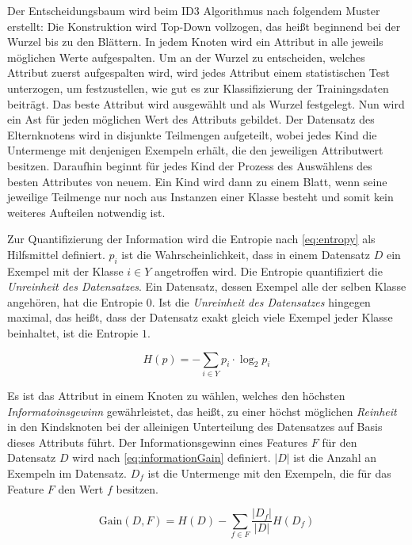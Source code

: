 Der Entscheidungsbaum wird beim ID3 Algorithmus nach folgendem Muster erstellt: Die Konstruktion wird Top-Down vollzogen, das heißt beginnend bei der Wurzel bis zu den Blättern. In jedem Knoten wird ein Attribut in alle jeweils möglichen Werte aufgespalten. Um an der Wurzel zu entscheiden, welches Attribut zuerst aufgespalten wird, wird jedes Attribut einem statistischen Test unterzogen, um festzustellen, wie \glqq gut\grqq{} es zur Klassifizierung der Trainingsdaten beiträgt. Das \glqq beste\grqq{} Attribut wird ausgewählt und als Wurzel festgelegt. Nun wird ein Ast für jeden möglichen Wert des Attributs gebildet. Der Datensatz des Elternknotens wird in disjunkte Teilmengen aufgeteilt, wobei jedes Kind die Untermenge mit denjenigen Exempeln erhält, die den jeweiligen Attributwert besitzen. Daraufhin beginnt für jedes Kind der Prozess des Auswählens des \glqq besten\grqq{} Attributes von neuem. Ein Kind wird dann zu einem Blatt, wenn seine jeweilige Teilmenge nur noch aus Instanzen einer Klasse besteht und somit kein weiteres Aufteilen notwendig ist.\cite[S. 55]{machine_mitchell}

Zur Quantifizierung der Information wird die Entropie nach \autoref{eq:entropy} als Hilfsmittel definiert. $p_i$ ist die Wahrscheinlichkeit, dass in einem Datensatz $D$ ein Exempel mit der Klasse $i \in Y$ angetroffen wird. Die Entropie quantifiziert die \emph{Unreinheit des Datensatzes}. Ein Datensatz, dessen Exempel alle der selben Klasse angehören, hat die Entropie $0$. Ist die \emph{Unreinheit des Datensatzes} hingegen maximal, das heißt, dass der Datensatz exakt gleich viele Exempel jeder Klasse beinhaltet, ist die Entropie $1$. \cite[S. 135]{machine_marsland}

\begin{equation}
H(p) = -\sum_{i \in Y} p_i \cdot \log_{2} p_i
\label{eq:entropy}
\end{equation}

Es ist das Attribut in einem Knoten zu wählen, welches den höchsten \emph{Informatoinsgewinn} gewährleistet, das heißt, zu einer höchst möglichen \emph{Reinheit} in den Kindsknoten bei der alleinigen Unterteilung des Datensatzes auf Basis dieses Attributs führt. Der Informationsgewinn eines Features $F$ für den Datensatz $D$ wird nach \autoref{eq:informationGain} definiert. $|D|$ ist die Anzahl an Exempeln im Datensatz. $D_f$ ist die Untermenge mit den Exempeln, die für das Feature $F$ den Wert $f$ besitzen.\cite[S. 136 - 137]{machine_marsland}

\begin{equation}
\text{Gain}(D,F) = H(D) - \sum_{f \in F} \frac{|D_f|}{|D|} H(D_f)
\label{eq:informationGain}
\end{equation}

